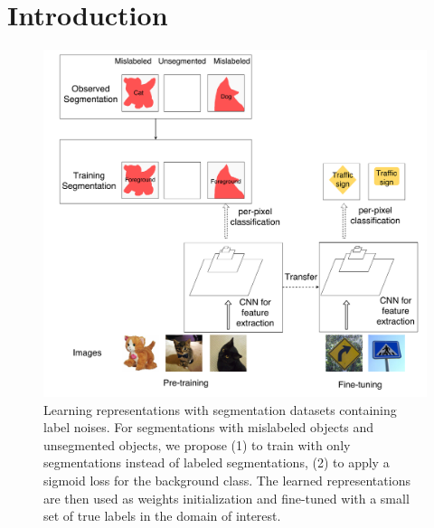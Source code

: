 \section{Introduction}
\label{introduction}




\begin{figure}[t]
\begin{center}
   \includegraphics[width=1.0\linewidth]{img/figure1}
\end{center}
   \caption{
   Learning representations with segmentation datasets containing label noises.
   For segmentations with mislabeled objects and unsegmented objects, we propose (1) to train with only segmentations instead of labeled segmentations, (2) to apply a sigmoid loss for the background class.
   The learned representations are then used as weights initialization and fine-tuned with a small set of true labels in the domain of interest.
   }
\label{fig:figure1}
\end{figure}



